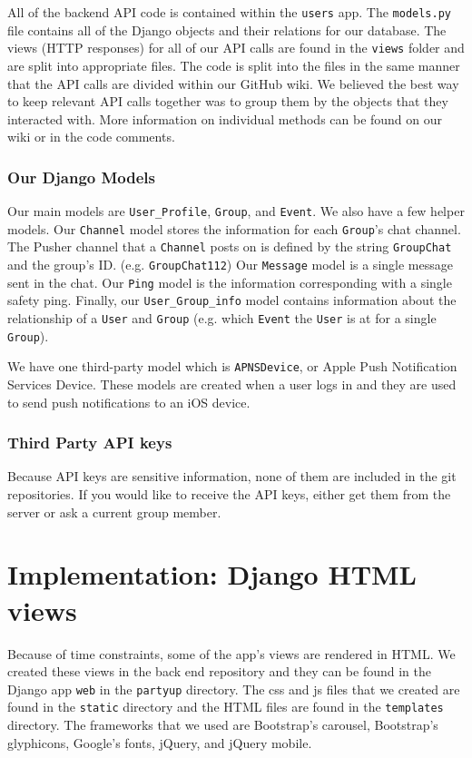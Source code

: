 \documentclass[12pt]{article}
\begin{document}
All of the backend API code is contained within the \texttt{users} app.
The \texttt{models.py} file contains all of the Django objects and their relations for our database. 
The views (HTTP responses) for all of our API calls are found in the \texttt{views} folder and are split into appropriate files.
The code is split into the files in the same manner that the API calls are divided within our GitHub wiki. 
We believed the best way to keep relevant API calls together was to group them by the objects that they interacted with. 
More information on individual methods can be found on our wiki or in the code comments.

\subsubsection{Our Django Models}

Our main models are \texttt{User\_Profile}, \texttt{Group}, and \texttt{Event}. 
We also have a few helper models. 
Our \texttt{Channel} model stores the information for each \texttt{Group}'s chat channel. 
The Pusher channel that a \texttt{Channel} posts on is defined by the string \texttt{GroupChat} and the group's ID. (e.g. \texttt{GroupChat112}) 
Our \texttt{Message} model is a single message sent in the chat. 
Our \texttt{Ping} model is the information corresponding with a single safety ping. 
Finally, our \texttt{User\_Group\_info} model contains information about the relationship of a \texttt{User} and \texttt{Group} (e.g. which \texttt{Event} the \texttt{User} is at for a single \texttt{Group}).

We have one third-party model which is \texttt{APNSDevice}, or Apple Push Notification Services Device. 
These models are created when a user logs in and they are used to send push notifications to an iOS device.

\subsubsection{Third Party API keys}

Because API keys are sensitive information, none of them are included in the git repositories. 
If you would like to receive the API keys, either get them from the server or ask a current group member.

\section{Implementation: Django HTML views}

Because of time constraints, some of the app's views are rendered in HTML. We created these views in the back end repository and they can be found in the Django app \texttt{web} in the \texttt{partyup} directory. The css and js files that we created are found in the  \texttt{static} directory and the HTML files are found in the  \texttt{templates} directory. The frameworks that we used are Bootstrap's carousel, Bootstrap's glyphicons, Google's fonts, jQuery, and jQuery mobile. 
\end{document}
